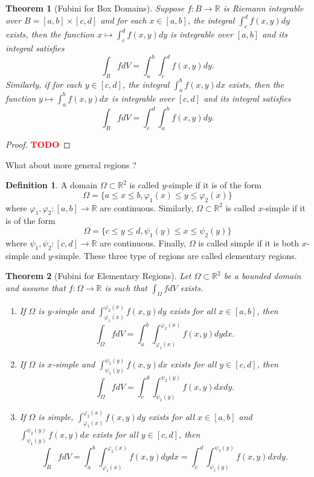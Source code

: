 \documentclass{article}
\theoremstyle{plain}
\newtheorem{theorem}{Theorem}[subsection]
\theoremstyle{definition}
\newtheorem*{definition}{Definition}
\newcommand{\R}{\mathbb{R}}
\newcommand{\td}{\textcolor{red}{\textbf{TODO}}}
\begin{document}
\begin{theorem}[Fubini for Box Domains]
    Suppose $f : B \to \R$ is Riemann integrable over $B = [a,b] \times [c,d]$ and for each $x \in [a,b]$, the integral $\int_{c}^{d}f(x,y)dy$ exists, then the function $x \mapsto \int_{c}^{d}f(x,y)dy$ is integrable over $[a,b]$ and its integral satisfies
    $$\int_BfdV = \int_{a}^{b}\int_{c}^{d}f(x,y)dy.$$
    Similarly, if for each $y \in [c,d]$, the integral $\int_{a}^{b}f(x,y)dx$ exists, then the function $y \mapsto \int_{a}^{b}f(x,y)dx$ is integrable over $[c,d]$ and its integral satisfies
    $$\int_BfdV = \int_{c}^{d}\int_{a}^{b}f(x,y)dy.$$
\end{theorem}

\begin{proof}
    \td 
\end{proof}

What about more general regions ? 

\begin{definition}
    A domain $\Omega \subset \R^2$ is called $y$-simple if it is of the form
    $$\Omega = \{a \leq x \leq b, \varphi_1(x) \leq y \leq \varphi_2(x)\}$$
    where $\varphi_1, \varphi_2 : [a,b] \to \R$ are continuous. Similarly, $\Omega \subset \R^2$ is called $x$-simple if it is of the form
    $$\Omega = \{c \leq y \leq d, \psi_1(y) \leq x \leq \psi_2(y)\}$$
    where $\psi_1, \psi_2 : [c,d] \to \R$ are continuous. Finally, $\Omega$ is called simple if it is both $x$-simple and $y$-simple. These three type of regions are called elementary regions.
\end{definition}

\begin{theorem}[Fubini for Elementary Regions]
    Let $\Omega \subset \R^2$ be a bounded domain and assume that $f : \Omega \to \R$ is such that $\int_{\Omega}fdV$ exists.
    \begin{enumerate}
        \item If $\Omega$ is $y$-simple and $\int_{\varphi_1(x)}^{\varphi_2(x)}f(x,y)dy$ exists for all $x \in [a,b]$, then
        $$\int_{\Omega}fdV = \int_{a}^{b}\int_{\varphi_1(x)}^{\varphi_2(x)}f(x,y)dydx.$$
        \item If $\Omega$ is $x$-simple and $\int_{\psi_1(y)}^{\psi_2(y)}f(x,y)dx$ exists for all $y \in [c,d]$, then
        $$\int_{\Omega}fdV = \int_{c}^{d}\int_{\psi_1(y)}^{\psi_2(y)}f(x,y)dxdy.$$
        \item If $\Omega$ is simple, $\int_{\varphi_1(x)}^{\varphi_2(x)}f(x,y)dy$ exists for all $x \in [a,b]$ and $\int_{\psi_1(y)}^{\psi_2(y)}f(x,y)dx$ exists for all $y \in [c,d]$, then
        $$\int_BfdV = \int_{a}^{b}\int_{\varphi_1(x)}^{\varphi_2(x)}f(x,y)dydx = \int_{c}^{d}\int_{\psi_1(y)}^{\psi_2(y)}f(x,y)dxdy.$$
    \end{enumerate}
\end{theorem}
\end{document}
